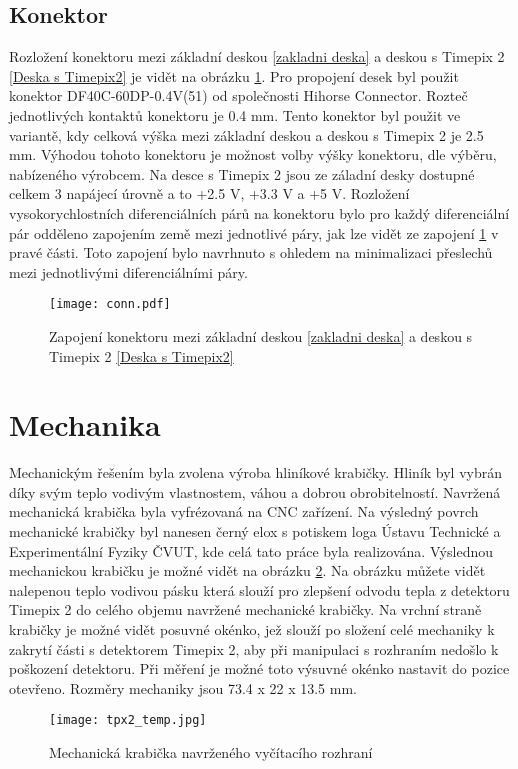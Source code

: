 	\subsection{Konektor}	%
	\label{konektor}
	Rozložení konektoru mezi základní deskou \ref{zakladni deska} a deskou s Timepix 2 \ref{Deska s Timepix2} je vidět na obrázku \ref{fig:konektor}. Pro propojení desek byl použit konektor DF40C-60DP-0.4V(51) od společnosti Hihorse Connector. Rozteč jednotlivých kontaktů konektoru je 0.4 mm. Tento konektor byl použit ve variantě, kdy celková výška mezi základní deskou a deskou s Timepix 2 je 2.5 mm. Výhodou tohoto konektoru je možnost volby výšky konektoru, dle výběru, nabízeného výrobcem. Na desce s Timepix 2 jsou ze záladní desky dostupné celkem 3 napájecí úrovně a to +2.5 V, +3.3 V a +5 V. Rozložení vysokorychlostních diferenciálních párů na konektoru bylo pro každý diferenciální pár odděleno zapojením země mezi jednotlivé páry, jak lze vidět ze zapojení \ref{fig:konektor} v pravé části. Toto zapojení bylo navrhnuto s ohledem na minimalizaci přeslechů mezi jednotlivými diferenciálními páry.
	\begin{figure}[h!]
		\centering
		\captionsetup{justification=centering}
		\texttt{[image: conn.pdf]}
		\caption{Zapojení konektoru mezi základní deskou \ref{zakladni deska} a deskou s Timepix 2 \ref{Deska s Timepix2}} 
		\label{fig:konektor}
	\end{figure} 
	
\section{Mechanika}
	Mechanickým řešením byla zvolena výroba hliníkové krabičky. Hliník byl vybrán díky svým teplo vodivým vlastnostem, váhou a dobrou obrobitelností. Navržená mechanická krabička byla vyfrézovaná na CNC zařízení. Na výsledný povrch mechanické krabičky byl nanesen černý elox s potiskem loga Ústavu Technické a Experimentální Fyziky ČVUT, kde celá tato práce byla realizována. Výslednou mechanickou krabičku je možné vidět na obrázku \ref{fig:mechanika}. Na obrázku můžete vidět nalepenou teplo vodivou pásku která slouží pro zlepšení odvodu tepla z detektoru Timepix 2 do celého objemu navržené mechanické krabičky. Na vrchní straně krabičky je možné vidět posuvné okénko, jež slouží po složení celé mechaniky k zakrytí části s detektorem Timepix 2, aby při manipulaci s rozhraním nedošlo k poškození detektoru. Při měření je možné toto výsuvné okénko nastavit do pozice otevřeno. Rozměry mechaniky jsou 73.4 x 22 x 13.5 mm. 
	\begin{figure}[h!]
		\centering
		\captionsetup{justification=centering}
		\texttt{[image: tpx2\_temp.jpg]}
		\caption{Mechanická krabička navrženého vyčítacího rozhraní} 
		\label{fig:mechanika}
	\end{figure}

